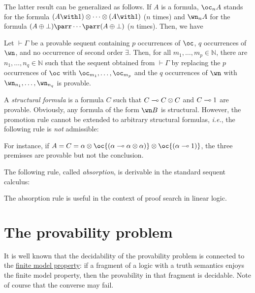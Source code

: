 The latter result can be generalized as follows. If \(A\) is a formula,
\(\oc_nA\) stands for the formula
\((A\with\one)\tens\cdots\tens(A\with\one)\) (\(n\) times) and
\(\wn_nA\) for the formula \((A\plus\bot)\parr\cdots\parr(A\plus\bot)\)
(\(n\) times). Then, we have

\begin{theorem}
Let $\vdash\Gamma$ be a provable sequent containing $p$ occurrences of $\oc$, $q$ occurrences of $\wn$, and no occurrence of second order $\exists$. Then, for all $m_1,\dotsc,m_p\in\mathbb N$, there are $n_1,\dotsc,n_q\in\mathbb N$ such that the sequent obtained from $\vdash\Gamma$ by replacing the $p$ occurrences of $\oc$ with $\oc_{m_1},\dotsc,\oc_{m_p}$ and the $q$ occurrences of $\wn$ with $\wn_{n_1},\dotsc,\wn_{n_q}$ is provable.
\end{theorem}

A \emph{structural formula} is a formula \(C\) such that
\(C\limp C\tens C\) and \(C\limp\one\) are provable. Obviously, any
formula of the form \(\wn B\) is structural. However, the promotion rule
cannot be extended to arbitrary structural formulas, \emph{i.e.}, the
following rule is \emph{not} admissible:
\begin{prooftree}
\end{prooftree}
For instance, if
\(A=C=\alpha\tens\oc{(\alpha\limp\alpha\tens\alpha)}\tens\oc{(\alpha\limp\one)}\),
the three premisses are provable but not the conclusion.

The following rule, called \emph{absorption}, is derivable in the
standard sequent calculus:
\begin{prooftree}
\end{prooftree}
The absorption rule is useful in the context of proof search in linear logic.

\section{The provability problem}\label{the-provability-problem}

It is well known that the decidability of the provability problem is
connected to the \hyperref[phase-semantics]{finite model property}: if a
fragment of a logic with a truth semantics enjoys the finite model
property, then the provability in that fragment is decidable. Note of
course that the converse may fail.

